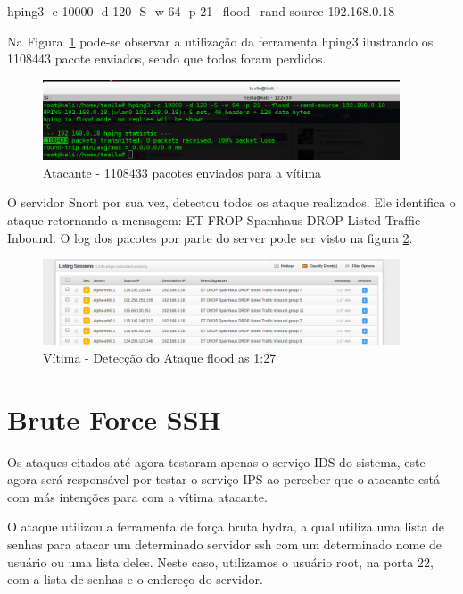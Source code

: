 \begin{framed}
	hping3 -c 10000 -d 120 -S -w 64 -p 21 --flood --rand-source 192.168.0.18
\end{framed}

	Na Figura~\ref{fig:atacante_hping3} pode-se observar a utilização da ferramenta hping3 ilustrando
	os 1108443 pacote enviados, sendo que todos foram perdidos.

	 \begin{figure}[h]
 	 \centering
 	 \includegraphics[width=400px, scale=1]{resource/atacante_hping3}
 	 \caption{Atacante - 1108433 pacotes enviados para a vítima}
  \label{fig:atacante_hping3}
  \end{figure}

	O servidor Snort por sua vez, detectou todos os ataque realizados. Ele identifica
	o ataque retornando a mensagem: ET FROP Spamhaus DROP Listed Traffic Inbound. O
	log dos pacotes por parte do server pode ser visto na figura \ref{fig:vitima_flood}.

	 \begin{figure}[h]
 	 \centering
 	 \includegraphics[width=400px, scale=1]{resource/vitima_flood}
 	 \caption{Vítima - Detecção do Ataque flood as 1:27}
  \label{fig:vitima_flood}
  \end{figure}

\section{Brute Force SSH}
\label{sec:Brute_Force_SSH}
	Os ataques citados até agora testaram apenas o serviço IDS do sistema, este agora
	será responsável por testar o serviço IPS ao perceber que o atacante está com más
	intenções para com a vítima atacante.

	O ataque utilizou a ferramenta de força bruta hydra, a qual utiliza uma lista
	de senhas para atacar um determinado servidor ssh com um determinado nome de
	usuário ou uma lista deles. Neste caso, utilizamos o usuário root, na porta 22,
	com a lista de senhas e o endereço do servidor.

